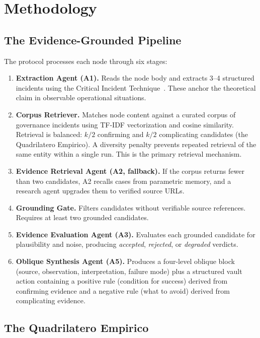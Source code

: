 \documentclass[10pt,twocolumn]{article}
\begin{document}
\section{Methodology}
\label{sec:method}

\subsection{The Evidence-Grounded Pipeline}
\label{subsec:pipeline}

The protocol processes each node through six stages:

\begin{enumerate}
    \item \textbf{Extraction Agent (A1).} Reads the node body and extracts 3--4 structured incidents using the Critical Incident Technique~\cite{flanagan1954cit}. These anchor the theoretical claim in observable operational situations.
    \item \textbf{Corpus Retriever.} Matches node content against a curated corpus of governance incidents using TF-IDF vectorization and cosine similarity. Retrieval is balanced: $k/2$ confirming and $k/2$ complicating candidates (the Quadrilatero Empirico). A diversity penalty prevents repeated retrieval of the same entity within a single run. This is the primary retrieval mechanism.
    \item \textbf{Evidence Retrieval Agent (A2, fallback).} If the corpus returns fewer than two candidates, A2 recalls cases from parametric memory, and a research agent upgrades them to verified source URLs.
    \item \textbf{Grounding Gate.} Filters candidates without verifiable source references. Requires at least two grounded candidates.
    \item \textbf{Evidence Evaluation Agent (A3).} Evaluates each grounded candidate for plausibility and noise, producing \emph{accepted}, \emph{rejected}, or \emph{degraded} verdicts.
    \item \textbf{Oblique Synthesis Agent (A5).} Produces a four-level oblique block (source, observation, interpretation, failure mode) plus a structured vault action containing a positive rule (condition for success) derived from confirming evidence and a negative rule (what to avoid) derived from complicating evidence.
\end{enumerate}

\subsection{The Quadrilatero Empirico}
\label{subsec:quadrilatero}
\end{document}
